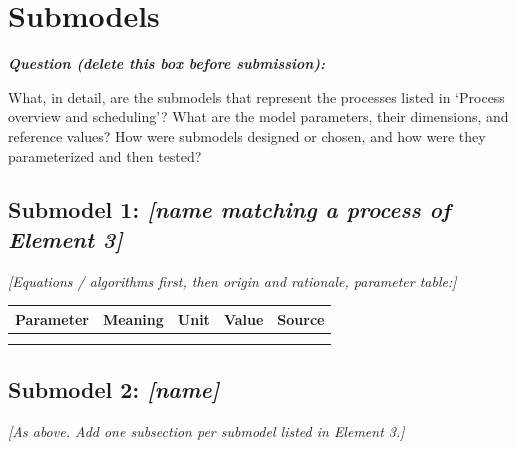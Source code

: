 \documentclass[11pt,a4paper]{article}
\newenvironment{question}
  {\begin{oddquestion}\small\itshape\color{oddquestioncolor}%
   \textbf{Question (delete this box before submission):}\par\smallskip}
  {\end{oddquestion}}
\begin{document}

\section{Submodels}
\begin{question}
What, in detail, are the submodels that represent the processes listed
in `Process overview and scheduling'? What are the model parameters,
their dimensions, and reference values? How were submodels designed or
chosen, and how were they parameterized and then tested?
\end{question}

\subsection{Submodel 1: \textit{[name matching a process of Element 3]}}
\textit{[Equations / algorithms first, then origin and rationale,
parameter table:]}

\begin{center}
\begin{tabular}{lllll}
\textbf{Parameter} & \textbf{Meaning} & \textbf{Unit} & \textbf{Value} & \textbf{Source} \\
\hline
 & & & & \\
 & & & &
\end{tabular}
\end{center}

\subsection{Submodel 2: \textit{[name]}}
\textit{[As above. Add one subsection per submodel listed in Element 3.]}


\end{document}
